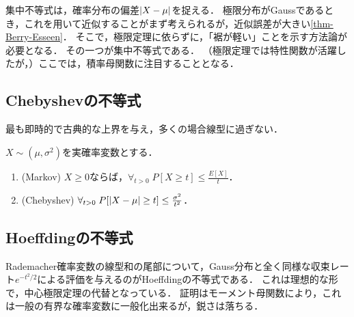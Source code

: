 \documentclass[uplatex,dvipdfmx]{jsreport}
\begin{document}
\begin{tcolorbox}[colframe=ForestGreen, colback=ForestGreen!10!white,breakable,colbacktitle=ForestGreen!40!white,coltitle=black,fonttitle=\bfseries\sffamily,
title=]
    集中不等式は，確率分布の偏差$\lvert X-\mu\rvert$を捉える．
    極限分布がGaussであるとき，これを用いて近似することがまず考えられるが，近似誤差が大きい\ref{thm-Berry-Esseen}．
    そこで，極限定理に依らずに，「裾が軽い」ことを示す方法論が必要となる．
    その一つが集中不等式である．
    （極限定理では特性関数が活躍したが，）ここでは，積率母関数に注目することとなる．
\end{tcolorbox}

\subsection{Chebyshevの不等式}

\begin{tcolorbox}[colframe=ForestGreen, colback=ForestGreen!10!white,breakable,colbacktitle=ForestGreen!40!white,coltitle=black,fonttitle=\bfseries\sffamily,
title=]
    最も即時的で古典的な上界を与え，多くの場合線型に過ぎない．
\end{tcolorbox}

\begin{theorem}
    $X\sim(\mu,\sigma^2)$を実確率変数とする．
    \begin{enumerate}
        \item (Markov) $X\ge0$ならば，$\forall_{t>0}\;P[X\ge t]\le\frac{E[X]}{t}$．
        \item (Chebyshev) $\forall_{t>0}\;P[\lvert X-\mu\rvert\ge t]\le\frac{\sigma^2}{t^2}$．
    \end{enumerate}
\end{theorem}

\subsection{Hoeffdingの不等式}

\begin{tcolorbox}[colframe=ForestGreen, colback=ForestGreen!10!white,breakable,colbacktitle=ForestGreen!40!white,coltitle=black,fonttitle=\bfseries\sffamily,
title=]
    Rademacher確率変数の線型和の尾部について，Gauss分布と全く同様な収束レート$e^{-t^2/2}$による評価を与えるのがHoeffdingの不等式である．
    これは理想的な形で，中心極限定理の代替となっている．
    証明はモーメント母関数により，これは一般の有界な確率変数に一般化出来るが，鋭さは落ちる．
\end{tcolorbox}
\end{document}
